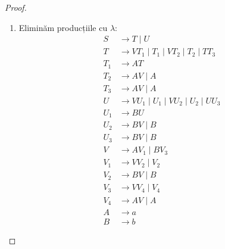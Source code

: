 \begin{proof}
\begin{enumerate}
        \item Eliminăm producțiile cu \(\lambda\):
              \begin{align*}
                  S   & \to T \mid U                                      \\
                  T   & \to V T_1 \mid T_1 \mid V T_2 \mid T_2 \mid T T_3 \\
                  T_1 & \to AT                                            \\
                  T_2 & \to AV \mid A                                     \\
                  T_3 & \to AV \mid A                                     \\
                  U   & \to V U_1 \mid U_1 \mid V U_2 \mid U_2 \mid U U_3 \\
                  U_1 & \to BU                                            \\
                  U_2 & \to BV \mid B                                     \\
                  U_3 & \to BV \mid B                                     \\
                  V   & \to AV_1 \mid B V_3                               \\
                  V_1 & \to VV_2 \mid V_2                                 \\
                  V_2 & \to BV \mid B                                     \\
                  V_3 & \to VV_4 \mid V_4                                 \\
                  V_4 & \to AV \mid A                                     \\
                  A   & \to a                                             \\
                  B   & \to b
              \end{align*}


\end{enumerate}
\end{proof}
